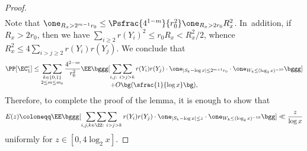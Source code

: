 \begin{proof}
\begin{multline*}
\end{multline*}
Note that $\one_{R_x > 2^{m-1}r_0}\le \Psfrac{4^{1-m}}{r_0^2} \one_{R_x>2r_0}R_x^2$. In~addition, if $R_x>2r_0$, then we have $\sum_{i\ge2}r(Y_i)^2\le r_0R_x<R_x^2/2$, whence $R_x^2\le 4\sum_{i>j\ge2}r(Y_i)r(Y_j)$.
We conclude that
\begin{multline*}
\PP[\EC_1^c]\le \mathop{\sum\sum}_{\substack{k\in\{0,1\} \\ 2\le m\le m_0} }
\frac{4^{2-m}}{r_0^2} \EE\bggg[ \mathop{\sum\sum}_{i,j :\ i>j>k}r(Y_i)r(Y_j) \cdot \one_{|S_k-\log x|\le 2^{m+1}r_0} \cdot \one_{W_k \le (\log_2x)^{-10}} \bggg] \\[-10pt]
+O\bg(\sfrac{1}{\log x}\bg),
\end{multline*}
Therefore, to complete the proof of the lemma, it is enough to show that
\begin{equation}
\label{eq:E(z)}
E(z) \coloneqq \EE \bggg[\mathop{\sum\sum\sum}_{\substack{i, j, k \in \ZZ:\ i>j>k}}r(Y_i)r(Y_j) \cdot \one_{|S_k-\log x|\le z} \cdot \one_{W_k \le (\log_2x)^{-10}} \bgg] \ll \frac{z}{\log x}
\end{equation}
uniformly for $z\in[0,4\log_2x]$.


\end{proof}
